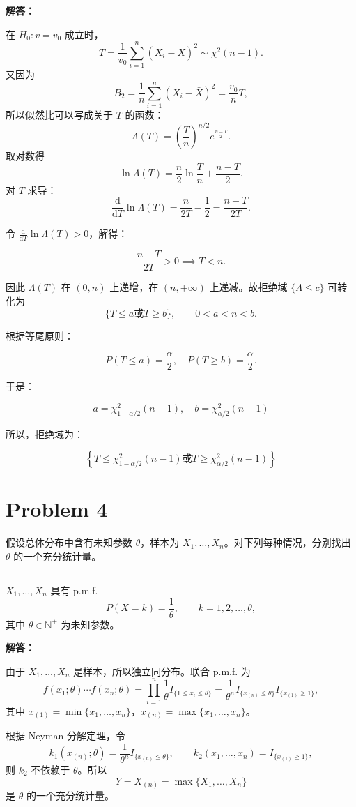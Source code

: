 \documentclass[12pt,a4paper]{article}
\begin{document}
\begin{answerbox}
\textbf{解答：}

在 $H_0:v=v_0$ 成立时，
\[
T=\frac{1}{v_0}\sum_{i=1}^n(X_i-\bar X)^2\sim \chi^2(n-1).
\]
又因为
\[
B_2=\frac{1}{n}\sum_{i=1}^n(X_i-\bar X)^2=\frac{v_0}{n}T,
\]
所以似然比可以写成关于 $T$ 的函数：
\[
\Lambda(T)
=\left(\frac{T}{n}\right)^{n/2}e^{\frac{n-T}{2}}.
\]
取对数得
\[
\ln\Lambda(T)=\frac n2\ln\frac{T}{n}+\frac{n-T}{2}.
\]
对 $T$ 求导：
\[
\frac{\text{d}}{\text{d}T}\ln\Lambda(T)=\frac{n}{2T}-\frac12=\frac{n-T}{2T}.
\]

令 $\frac{\text{d}}{\text{d}T}\ln\Lambda(T) > 0$，解得：

$$
\frac{n-T}{2T} > 0 \implies T < n.
$$

因此 $\Lambda(T)$ 在 $(0,n)$ 上递增，在 $(n,+\infty)$ 上递减。故拒绝域 $\{\Lambda\leq c\}$ 可转化为
\[
\{T\leq a \text{或} T\geq b\},
\qquad 0<a<n<b.
\]

根据等尾原则：

$$
P(T \leq a) = \frac{\alpha}{2} , \quad P(T \geq b) = \frac{\alpha}{2}.
$$

于是：

$$
a = \chi^2_{1-\alpha/2}(n-1), \quad b = \chi^2_{\alpha/2}(n-1)
$$

所以，拒绝域为：

$$
\left\{T \leq \chi^2_{1-\alpha/2}(n-1) \text{或} T \geq \chi^2_{\alpha/2}(n-1)\right\}
$$

\end{answerbox}


\section{Problem 4}

假设总体分布中含有未知参数 $\theta$，样本为 $X_1,\ldots,X_n$。对下列每种情况，分别找出 $\theta$ 的一个充分统计量。

\subsection{}

$X_1,\ldots,X_n$ 具有 p.m.f.
  \[
  P(X=k)=\frac{1}{\theta},\qquad k=1,2,\ldots,\theta,
  \]
  其中 $\theta\in\mathbb{N}^+$ 为未知参数。

\begin{answerbox}
\textbf{解答：}

由于 $X_1,\ldots,X_n$ 是样本，所以独立同分布。联合 p.m.f. 为
\[
f(x_1;\theta)\cdots f(x_n;\theta)
=\prod_{i=1}^n\frac1\theta I_{\{1\leq x_i\leq \theta\}}
=\frac{1}{\theta^n}I_{\{x_{(n)}\leq \theta\}}I_{\{x_{(1)}\geq 1\}},
\]
其中 $x_{(1)}=\min\{x_1,\ldots,x_n\}$，$x_{(n)}=\max\{x_1,\ldots,x_n\}$。

根据 Neyman 分解定理，令
\[
k_1(x_{(n)};\theta)=\frac{1}{\theta^n}I_{\{x_{(n)}\leq\theta\}},
\qquad
k_2(x_1,\ldots,x_n)=I_{\{x_{(1)}\geq 1\}},
\]
则 $k_2$ 不依赖于 $\theta$。所以
\[
Y=X_{(n)}=\max\{X_1,\ldots,X_n\}
\]
是 $\theta$ 的一个充分统计量。
\end{answerbox}
\end{document}
